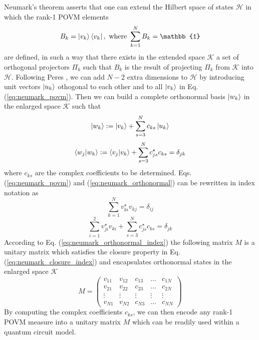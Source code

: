 Neumark's theorem \cite{neumark1940} asserts that one can extend the Hilbert space of states $\mathcal{H}$ in which the rank-1 POVM elements 
\begin{equation}\label{eq:neumark_povm}
B_k = \ket{v_{k}} \bra{v_{k}},\ \text{where}\ \sum_{k=1}^{N} B_{k} = \mathbb{1}
\end{equation}
 are defined, in such a way that there exists in the extended space $\mathcal{K}$ a set of orthogonal projectors $\Pi_{k}$ such that $B_k$
 is the result of projecting $\Pi_{k}$ from $\mathcal{K}$ into $\mathcal{H}$. Following Peres \cite{peres1995}, we can add $N-2$ extra dimensions to $\mathcal{H}$ by introducing unit vectors $\ket{u_{k}}$ othogonal to each other and to all $\ket{v_{k}}$ in Eq. (\ref{eq:neumark_povm}). Then we can build a complete orthonormal basis $\ket{w_{k}}$ in the enlarged space $\mathcal{K}$ such that
\begin{equation}
\ket{w_{k}} := \ket{v_{k}} + \sum_{s=3}^{N} c_{k s} \ket{u_{k}}
\end{equation}
\begin{equation}\label{eq:neumark_orthonormal}
\bra{w_{j}} \ket{w_{k}} := \bra{v_{j}} \ket{v_{k}} + \sum_{s=3}^{N} c_{j s}^{\star} c_{k s} = \delta_{j k}
\end{equation}
where $c_{ks}$ are the complex coefficients to be determined. Eqs. (\ref{eq:neumark_povm}) and (\ref{eq:neumark_orthonormal}) can be rewritten in index notation as 
\begin{equation}\label{eq:neumark_closure_index}
\sum_{k=1}^{N}v_{k i}^{\star} v_{k j} = \delta_{ij}
\end{equation}
\begin{equation}\label{eq:neumark_orthonormal_index}
\sum_{i=1}^{2} v_{j i}^{\star} v_{k i} + \sum_{s=3}^{N} c_{j s}^{\star} c_{k s} = \delta_{j k}
\end{equation}
According to Eq. (\ref{eq:neumark_orthonormal_index}) the following matrix $M$ is a unitary matrix which satisfies the closure property in Eq. (\ref{eq:neumark_closure_index}) and encapsulates orthonormal states in the enlarged space $\mathcal{K}$ 
\begin{equation}
M = 
\begin{pmatrix}
v_{1 1} & v_{1 2} & c_{13} & \dots & c_{1 N} \\
v_{2 1} & v_{2 2} & c_{23} & \dots & c_{2 N} \\
\vdots & \vdots & \vdots & \vdots &  \vdots \\
v_{N1} & v_{N2} & c_{N3} & \dots & c_{NN}
\end{pmatrix}
\end{equation}
By computing the complex coefficients $c_{ks}$, we can then encode any rank-1 POVM measure into a unitary matrix $M$ which can be readily used within a quantum circuit model.